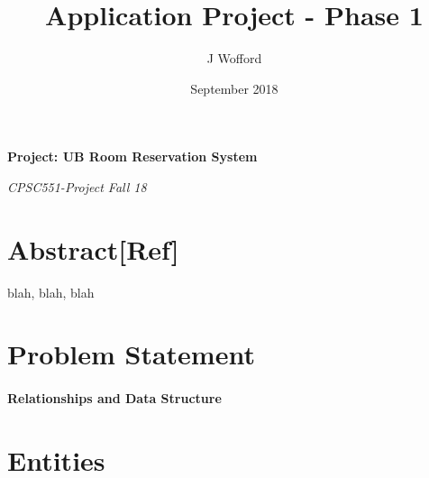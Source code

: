 \documentclass[11pt]{report}
\title{Application Project - Phase 1}
\author{J Wofford}
\date{September 2018}
\begin{document}

\begin{titlepage}
   \begin{center}
      \Large\textbf{Project: UB Room Reservation System}
      
     \vspace*{3\bigskipamount}
      \large\bfseries\textit{}
      
      \large\textit{CPSC551-Project Fall 18}
   \end{center}
\end{titlepage}

\section*{Abstract\hfill [Ref]}
blah, blah, blah

\section*{Problem Statement}

\paragraph{Relationships and Data Structure}

\section*{Entities}
\end{document}
